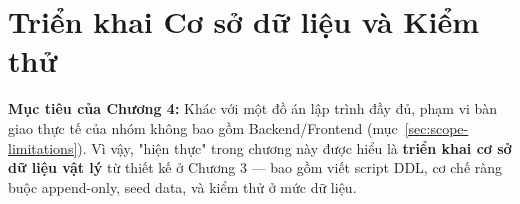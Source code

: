 \chapter{Triển khai Cơ sở dữ liệu và Kiểm thử}
\label{ch:4}

\noindent\textbf{Mục tiêu của Chương 4:} Khác với một đồ án lập trình đầy đủ, phạm vi bàn giao thực tế của nhóm không bao gồm Backend/Frontend (mục~\ref{sec:scope-limitations}). Vì vậy, "hiện thực" trong chương này được hiểu là \textbf{triển khai cơ sở dữ liệu vật lý} từ thiết kế ở Chương 3 — bao gồm viết script DDL, cơ chế ràng buộc append-only, seed data, và kiểm thử ở mức dữ liệu.




